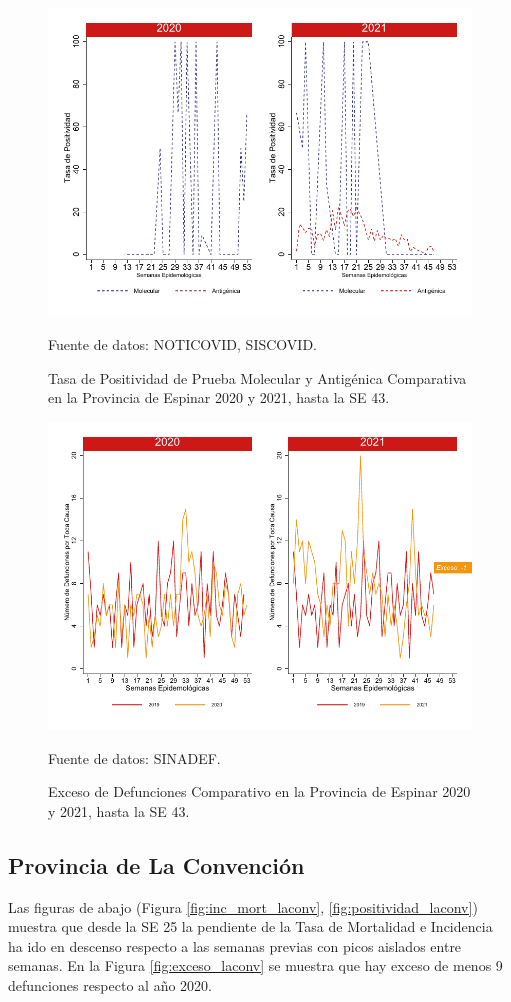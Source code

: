 \documentclass[12pt,a4paper,openany]{book}
\begin{document}
		\begin{figure}[h]
			\caption{Tasa de Positividad de Prueba Molecular y Antigénica Comparativa en la Provincia de Espinar 2020 y 2021, hasta la SE 43.}\label{fig:positividad_espinar}
			\begin{center}
				\includegraphics[width=0.7\linewidth]{../figuras/positividad_20_21_8}
			\end{center}
			{\footnotesize {Fuente de datos: NOTICOVID, SISCOVID.}}
		\end{figure}
		
		\begin{figure}[h]
			\caption{Exceso de Defunciones Comparativo en la Provincia de Espinar 2020 y 2021, hasta la SE 43.}\label{fig:exceso_espinar}
			\begin{center}
				\includegraphics[width=0.7\linewidth]{../figuras/exceso_8}
			\end{center}
			{\footnotesize {Fuente de datos: SINADEF.}}
		\end{figure}
		
		\clearpage
		
		\subsection*{Provincia de La Convención}
		\noindent Las figuras de abajo (Figura \ref{fig:inc_mort_laconv}, \ref{fig:positividad_laconv}) muestra que desde la SE 25 la pendiente de la Tasa de Mortalidad e Incidencia ha ido en descenso respecto a las semanas previas con picos aislados entre semanas. En la Figura \ref{fig:exceso_laconv} se muestra que hay exceso de menos 9 defunciones respecto al año 2020.
		
\end{document}
